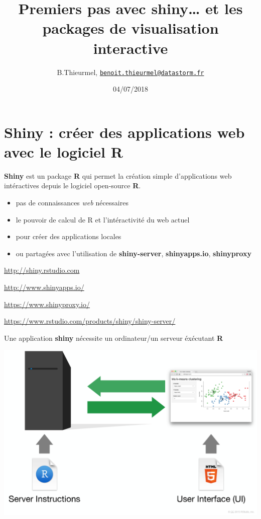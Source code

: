 \documentclass[]{article}
\title{Premiers pas avec shiny\ldots{} et les packages de visualisation
interactive}
\author{B.Thieurmel,
\href{mailto:benoit.thieurmel@datastorm.fr}{\nolinkurl{benoit.thieurmel@datastorm.fr}}}
\date{04/07/2018}
\providecommand{\tightlist}{%
  \setlength{\itemsep}{0pt}\setlength{\parskip}{0pt}}
\begin{document}
\maketitle

{
\setcounter{tocdepth}{2}
\tableofcontents
}
\section{Shiny : créer des applications web avec le logiciel
R}\label{shiny-creer-des-applications-web-avec-le-logiciel-r}

\textbf{Shiny} est un package \textbf{R} qui permet la création simple
d'applications web intéractives depuis le logiciel open-source
\textbf{R}.

\begin{itemize}
\tightlist
\item
  pas de connaissances \emph{web} nécessaires
\item
  le pouvoir de calcul de R et l'intéractivité du web actuel
\item
  pour créer des applications locales
\item
  ou partagées avec l'utilisation de \textbf{shiny-server},
  \textbf{shinyapps.io}, \textbf{shinyproxy}
\end{itemize}

\url{http://shiny.rstudio.com}

\url{http://www.shinyapps.io/}

\url{https://www.shinyproxy.io/}

\url{https://www.rstudio.com/products/shiny/shiny-server/}

Une application \textbf{shiny} nécessite un ordinateur/un serveur
éxécutant \textbf{R}

\includegraphics{img/server_R.png}
\end{document}
